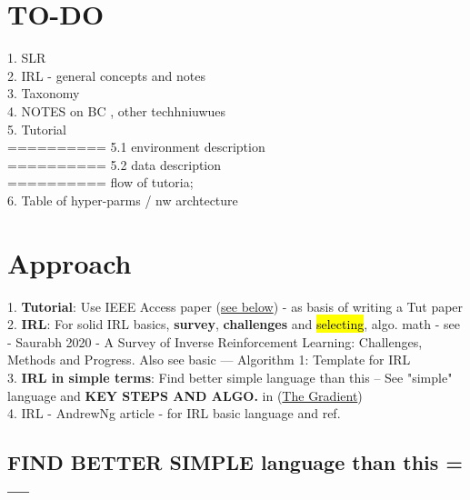 \documentclass{article}
\newcommand{\hlc}[2][purple!10]{{\colorlet{foo}{#1} \sethlcolor{foo}\hl{#2}}}
\begin{document}
	
	\section{TO-DO}
	
	1. SLR \\
	2. IRL - general concepts and notes \\
	3. Taxonomy \\
	4. NOTES on BC , other techhniuwues\\
	5. Tutorial \\
	========== 5.1 environment description\\
	========== 5.2 data  description\\
	========== flow of tutoria; \\
	
	6. Table of hyper-parms / nw archtecture\\
	
	
	
	\clearpage
	
	\section{Approach}
	
	1. \textbf{Tutorial}: Use IEEE Access paper (\href{https://ieeexplore.ieee.org/document/9086464}{see below}) - as basis of writing a Tut paper\\
	2. \textbf{IRL}: For solid IRL basics, \textbf{survey}, \textbf{challenges} and \hlc{selecting},  algo. math - see - Saurabh 2020 - A Survey of Inverse Reinforcement Learning: Challenges, Methods and Progress. Also see basic --- Algorithm 1: Template for IRL \\
	3. \textbf{IRL in simple terms}: Find better simple language than this --  See "simple" language and \textbf{KEY STEPS AND ALGO.} in (\href{https://thegradient.pub/learning-from-humans-what-is-inverse-reinforcement-learning/}{The Gradient}) \\
	4. IRL - AndrewNg article - for IRL basic language and ref. 
	
	\subsection{FIND BETTER SIMPLE language than this =--- }
	
\end{document}
